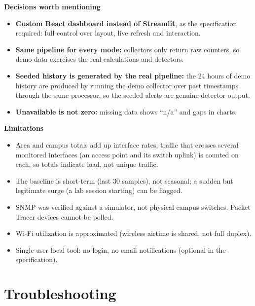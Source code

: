 \documentclass[11pt,a4paper]{article}
\begin{document}
\textbf{Decisions worth mentioning}
\begin{itemize}
  \item \textbf{Custom React dashboard instead of Streamlit}, as the specification required: full control over layout, live
        refresh and interaction.
  \item \textbf{Same pipeline for every mode:} collectors only return raw counters, so demo data exercises the real calculations
        and detectors.
  \item \textbf{Seeded history is generated by the real pipeline:} the 24 hours of demo history are produced by running the demo
        collector over past timestamps through the same processor, so the seeded alerts are genuine detector output.
  \item \textbf{Unavailable is not zero:} missing data shows ``n/a'' and gaps in charts.
\end{itemize}

\textbf{Limitations}
\begin{itemize}
  \item Area and campus totals add up interface rates; traffic that crosses several monitored interfaces (an access point and its
        switch uplink) is counted on each, so totals indicate load, not unique traffic.
  \item The baseline is short-term (last 30 samples), not seasonal; a sudden but legitimate surge (a lab session starting) can be flagged.
  \item SNMP was verified against a simulator, not physical campus switches. Packet Tracer devices cannot be polled.
  \item Wi-Fi utilization is approximated (wireless airtime is shared, not full duplex).
  \item Single-user local tool: no login, no email notifications (optional in the specification).
\end{itemize}

\section{Troubleshooting}
\end{document}

